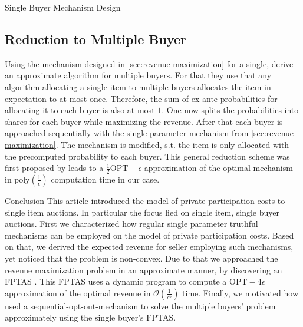 \documentclass[11pt,a4paper]{article}
\newcommand{\1}[1]{\mbox{\rm\bf 1}_{#1}}
\begin{document}
\begin{section}{Single Buyer Mechanism Design}
 \subsection{Reduction to Multiple Buyer}
 Using the mechanism designed in \autoref{sec:revenue-maximization} for a single, \citet{primary} derive an approximate algorithm for multiple buyers.
 For that they use that any algorithm allocating a single item to multiple buyers allocates the item in expectation to at most once.
 Therefore, the sum of ex-ante probabilities for allocating it to each buyer is also at most $1$.
 One now splits the probabilities into shares for each buyer while maximizing the revenue.
 After that each buyer is approached sequentially with the single parameter mechanism from \autoref{sec:revenue-maximization}.
 The mechanism is modified, s.t. the item is only allocated with the precomputed probability to each buyer.
 This general reduction scheme was first proposed by \citet{alaei2012bayesian,alaei2014bayesian} leads to a $\frac{1}{2}\mathrm{OPT} - \epsilon$ approximation of the optimal mechanism in $\mathrm{poly}\left(\frac{1}{\epsilon}\right)$ computation time in our case.
\end{section}

\begin{section}{Conclusion}
 This article introduced the model of private participation costs to single item auctions.
 In particular the focus lied on single item, single buyer auctions.
 First we characterized how regular single parameter truthful mechanisms can be employed on the model of private participation costs.
 Based on that, we derived the expected revenue for seller employing such mechanisms, yet noticed that the problem is non-convex.
 Due to that we approached the revenue maximization problem in an approximate manner, by discovering an FPTAS \cite{primary}.
 This FPTAS uses a dynamic program to compute a $\mathrm{OPT}-4\epsilon$ approximation of the optimal revenue in $\mathcal{O}\left(\frac{1}{\epsilon^5}\right)$ time.
 Finally, we motivated how \citet{primary} used a sequential-opt-out-mechanism to solve the multiple buyers' problem approximately using the single buyer's FPTAS.

\end{section}

\end{document}
